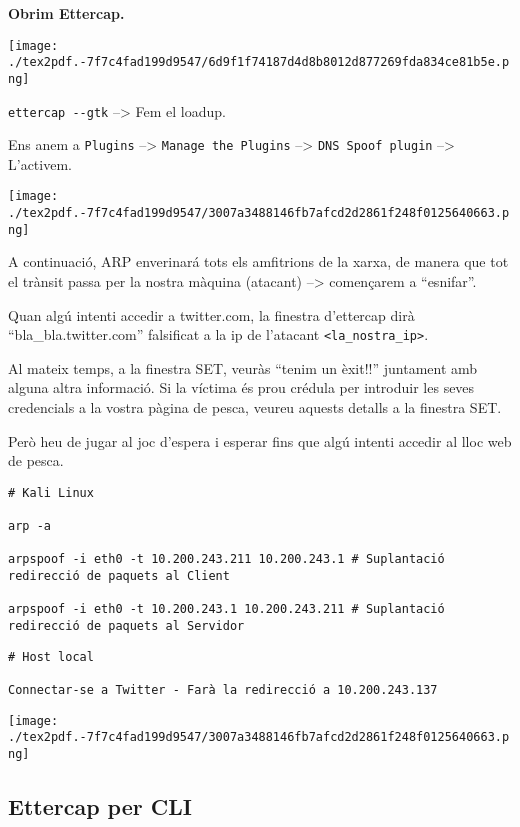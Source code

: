 \documentclass[]{article}
\begin{document}
\textbf{Obrim Ettercap.}

\texttt{[image: ./tex2pdf.-7f7c4fad199d9547/6d9f1f74187d4d8b8012d877269fda834ce81b5e.png]}

\texttt{ettercap\ -\/-gtk} --\textgreater{} Fem el loadup.

Ens anem a \texttt{Plugins} --\textgreater{}
\texttt{Manage\ the\ Plugins} --\textgreater{}
\texttt{DNS\ Spoof\ plugin} --\textgreater{} L'activem.

\texttt{[image: ./tex2pdf.-7f7c4fad199d9547/3007a3488146fb7afcd2d2861f248f0125640663.png]}

A continuació, ARP enverinará tots els amfitrions de la xarxa, de manera
que tot el trànsit passa per la nostra màquina (atacant)
--\textgreater{} començarem a ``esnifar''.

Quan algú intenti accedir a twitter.com, la finestra d'ettercap dirà
``bla\_bla.twitter.com'' falsificat a la ip de l'atacant
\texttt{\textless{}la\_nostra\_ip\textgreater{}}.

Al mateix temps, a la finestra SET, veuràs ``tenim un èxit!!'' juntament
amb alguna altra informació. Si la víctima és prou crédula per introduir
les seves credencials a la vostra pàgina de pesca, veureu aquests
detalls a la finestra SET.

Però heu de jugar al joc d'espera i esperar fins que algú intenti
accedir al lloc web de pesca.

\begin{verbatim}
# Kali Linux

arp -a

arpspoof -i eth0 -t 10.200.243.211 10.200.243.1 # Suplantació redirecció de paquets al Client

arpspoof -i eth0 -t 10.200.243.1 10.200.243.211 # Suplantació redirecció de paquets al Servidor
\end{verbatim}

\begin{verbatim}
# Host local

Connectar-se a Twitter - Farà la redirecció a 10.200.243.137

\end{verbatim}

\texttt{[image: ./tex2pdf.-7f7c4fad199d9547/3007a3488146fb7afcd2d2861f248f0125640663.png]}

\hypertarget{ettercap-per-cli}{%
\subsection{\texorpdfstring{\textbf{Ettercap per
CLI}}{Ettercap per CLI}}\label{ettercap-per-cli}}
\end{document}
